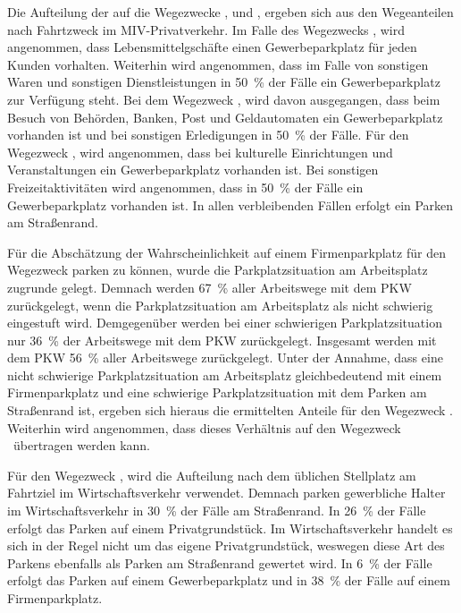 Die Aufteilung der \UCs auf die Wegezwecke \Einkaufdot, \Erledigung und \Freizeitdot, ergeben sich aus den Wegeanteilen nach Fahrtzweck im \gls{MIV}-Privatverkehr. \cite{Rikus2015}
Im Falle des Wegezwecks \Einkaufdot, wird angenommen, dass Lebensmittelgschäfte einen Gewerbeparkplatz für jeden Kunden vorhalten.
Weiterhin wird angenommen, dass im Falle von sonstigen Waren und sonstigen Dienstleistungen in \SI{50}{\percent} der Fälle ein Gewerbeparkplatz zur Verfügung steht.
Bei dem Wegezweck \Erledigungdot, wird davon ausgegangen, dass beim Besuch von Behörden, Banken, Post und Geldautomaten ein Gewerbeparkplatz vorhanden ist und bei sonstigen Erledigungen in \SI{50}{\percent} der Fälle.
Für den Wegezweck \Freizeitdot, wird angenommen, dass bei kulturelle Einrichtungen und Veranstaltungen ein Gewerbeparkplatz vorhanden ist.
Bei sonstigen Freizeitaktivitäten wird angenommen, dass in \SI{50}{\percent} der Fälle ein Gewerbeparkplatz vorhanden ist.
In allen verbleibenden Fällen erfolgt ein Parken am Straßenrand.\medskip

Für die Abschätzung der Wahrscheinlichkeit auf einem Firmenparkplatz für den Wegezweck \Arbeit parken zu können, wurde die Parkplatzsituation am Arbeitsplatz zugrunde gelegt.
Demnach werden \SI{67}{\percent} aller Arbeitswege mit dem \gls{PKW} zurückgelegt, wenn die Parkplatzsituation am Arbeitsplatz als nicht schwierig eingestuft wird.
Demgegenüber werden bei einer schwierigen Parkplatzsituation nur \SI{36}{\percent} der Arbeitswege mit dem \gls{PKW} zurückgelegt.
Insgesamt werden mit dem \gls{PKW} \SI{56}{\percent} aller Arbeitswege zurückgelegt. \cite{Ecke2020}
Unter der Annahme, dass eine nicht schwierige Parkplatzsituation am Arbeitsplatz gleichbedeutend mit einem Firmenparkplatz und eine schwierige Parkplatzsituation mit dem Parken am Straßenrand ist, ergeben sich hieraus die ermittelten Anteile für den Wegezweck \Arbeitdot.
Weiterhin wird angenommen, dass dieses Verhältnis auf den Wegezweck \Ausbildung~übertragen werden kann.\medskip

Für den Wegezweck \dienstdot, wird die Aufteilung nach dem üblichen Stellplatz am Fahrtziel im Wirtschaftsverkehr verwendet. \cite{Rikus2015}
Demnach parken gewerbliche Halter im Wirtschaftsverkehr in \SI{30}{\percent} der Fälle am Straßenrand.
In \SI{26}{\percent} der Fälle erfolgt das Parken auf einem Privatgrundstück.
Im Wirtschaftsverkehr handelt es sich in der Regel nicht um das eigene Privatgrundstück, weswegen diese Art des Parkens ebenfalls als Parken am Straßenrand gewertet wird.
In \SI{6}{\percent} der Fälle erfolgt das Parken auf einem Gewerbeparkplatz und in \SI{38}{\percent} der Fälle auf einem Firmenparkplatz.\medskip

